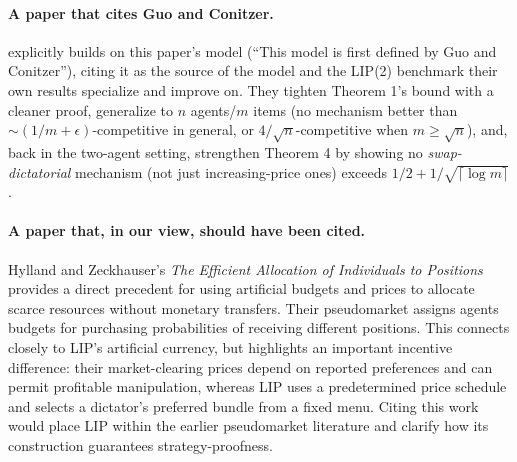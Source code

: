 
\paragraph{A paper that cites Guo and Conitzer.} \cite{han2011strategy} explicitly builds on this paper's model (``This model is first defined by Guo and Conitzer''), citing it as the source of the model and the LIP(2) benchmark their own results specialize and improve on. They tighten Theorem 1's bound with a cleaner proof, generalize to $n$ agents/$m$ items (no mechanism better than $\sim(1/m+\epsilon)$-competitive in general, or $4/\sqrt n$-competitive when $m\ge\sqrt n$), and, back in the two-agent setting, strengthen Theorem 4 by showing no \emph{swap-dictatorial} mechanism (not just increasing-price ones) exceeds $1/2+1/\sqrt{\lceil\log m\rceil}$.

\paragraph{A paper that, in our view, should have been cited.}  Hylland and Zeckhauser's \emph{The Efficient Allocation of Individuals to Positions} \cite{HyllandZeckhauser1979} provides a direct precedent for using artificial budgets and prices to allocate scarce resources without monetary transfers. Their pseudomarket assigns agents budgets for purchasing probabilities of receiving different positions. This connects closely to LIP's artificial currency, but highlights an important incentive difference: their market-clearing prices depend on reported preferences and can permit profitable manipulation, whereas LIP uses a predetermined price schedule and selects a dictator's preferred bundle from a fixed menu. Citing this work would place LIP within the earlier pseudomarket literature and clarify how its construction guarantees strategy-proofness.

